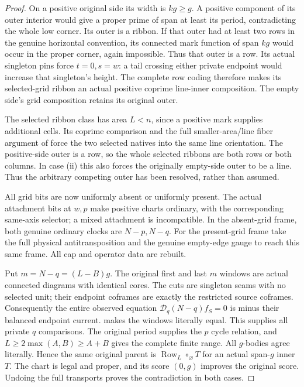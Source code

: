 \documentclass[11pt,a4paper]{amsart}
\numberwithin{equation}{section}
\theoremstyle{plain}
\theoremstyle{definition}
\newcommand{\Row}{\operatorname{Row}}
\newcommand{\DD}{\mathscr D}
\begin{document}
\begin{proof}
On a positive original side its width is \(kg\ge g\).  A positive component
of its outer interior would give a proper prime of span at least its
period, contradicting the whole low corner.  Its outer is a ribbon.
If that outer had at least two rows in the genuine horizontal convention,
its connected mark function of span \(kg\) would occur in the proper
corner, again impossible.  Thus that outer is a row.  Its actual singleton
pins force \(t=0,s=w\): a tail crossing either private endpoint would
increase that singleton's height.  The complete row coding therefore
makes its selected-grid ribbon an actual positive coprime line-inner
composition.  The empty side's grid composition retains its original
outer.

The selected ribbon class has area \(L<n\), since a positive mark supplies
additional cells.  Its coprime comparison and the full smaller-area/line
fiber argument of  force the two selected natives
into the same line orientation.  The positive-side outer is a row, so the
whole selected ribbons are both rows or both columns.  In case (ii) this
also forces the originally empty-side outer to be a line.  Thus the
arbitrary competing outer has been resolved, rather than assumed.

All grid bits are now uniformly absent or uniformly present.  The actual
attachment bits at \(w,p\) make positive charts ordinary, with the
corresponding same-axis selector; a mixed attachment is incompatible.
In the absent-grid frame, both genuine ordinary clocks are \(N-p,N-q\).
For the present-grid frame take the full physical antitransposition and
the genuine empty-edge gauge to reach this same frame.  All cap and
operator data are rebuilt.

Put \(m=N-q=(L-B)g\).  The original first and last \(m\) windows are actual
connected diagrams with identical cores.  The cuts are singleton seams
with no selected unit; their endpoint coframes are exactly the restricted
source coframes.  Consequently the entire observed equation
\(\DD_q(N-q)f_S=0\) is minus their balanced endpoint current.
 makes the windows literally equal.  This supplies
all private \(q\) comparisons.  The original period supplies the \(p\) cycle
relation, and \(L\ge2\max(A,B)\ge A+B\) gives the complete finite range.
All \(g\)-bodies agree literally.  Hence the same original parent is
\(\Row_L\circ_\varnothing T\) for an actual span-\(g\) inner \(T\).
The chart is legal and proper, and its score \((0,g)\) improves the
original score.  Undoing the full transports proves the contradiction
in both cases.
\end{proof}
\end{document}
